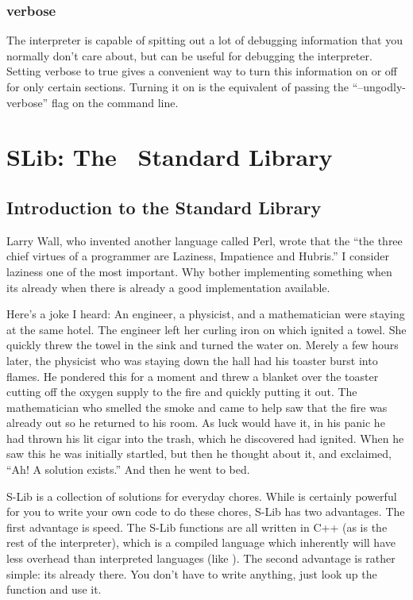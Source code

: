 \subsection{verbose}

The interpreter is capable of spitting out a lot of debugging information that you normally don't care about, but can be useful for debugging the interpreter.  Setting verbose to true gives a convenient way to turn this information on or off for only certain sections.  Turning it on is the equivalent of passing the ``--ungodly-verbose'' flag on the command line.


%
%

\chapter{SLib: The \SSquared\ Standard Library}

\section{Introduction to the Standard Library}
Larry Wall, who invented another language called Perl, wrote that the ``the three chief virtues of a programmer are Laziness, Impatience and Hubris.''  I consider laziness one of the most important.  Why bother implementing something when its already when there is already a good implementation available.

Here's a joke I heard:  An engineer, a physicist, and a mathematician were staying at the same hotel.  The engineer left her curling iron on which ignited a towel.  She quickly threw the towel in the sink and turned the water on.  Merely a few hours later, the physicist who was staying down the hall had his toaster burst into flames.  He pondered this for a moment and threw a blanket over the toaster cutting off the oxygen supply to the fire and quickly putting it out.  The mathematician who smelled the smoke and came to help saw that the fire was already out so he returned to his room.  As luck would have it, in his panic he had thrown his lit cigar into the trash, which he discovered had ignited.  When he saw this he was initially startled, but then he thought about it, and exclaimed, ``Ah!  A solution exists.''  And then he went to bed.

S-Lib is a collection of solutions for everyday chores.  While \SSquared is certainly powerful for you to write your own code to do these chores, S-Lib has two advantages.  The first advantage is speed.  The S-Lib functions are all written in C++ (as is the rest of the interpreter), which is a compiled language which inherently will have less overhead than interpreted languages (like \SSquared{}).  The second advantage is rather simple: its already there.  You don't have to write anything, just look up the function and use it.

